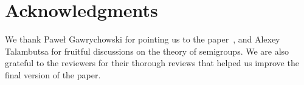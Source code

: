 \documentclass{toc}
\begin{document}
%
%
%
%
%
%
%
%


\section*{Acknowledgments}
We thank
Pawe\l{} Gawrychowski
for pointing us to the
paper~\cite{DBLP:journals/ijcga/ChazelleR91}, and Alexey Talambutsa for
fruitful discussions on the theory of semigroups.
We are also grateful to the reviewers for their thorough reviews that helped us
improve the final version of the paper.
\end{document}
